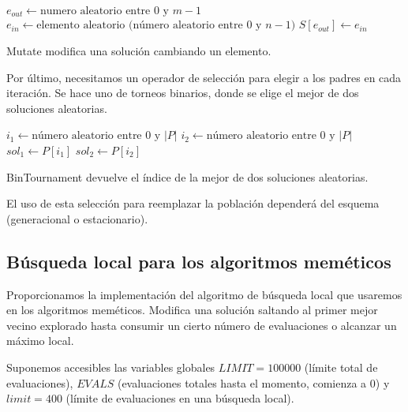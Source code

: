 \documentclass{article}
\begin{document}
\begin{algorithm}[H]
	\DontPrintSemicolon %
	$e_{out}\gets\text{numero aleatorio entre $0$ y $m-1$}$ 
	$e_{in}\gets\text{elemento aleatorio (número aleatorio entre $0$ y $n-1$)}$\;
	$S[e_{out}]\gets e_{in}$
	\caption{{\sc Mutate} modifica una solución cambiando un elemento.}
	\label{alg:mutate}
\end{algorithm}

Por último, necesitamos un operador de selección para elegir a los padres en cada iteración. Se hace uno de torneos binarios, donde se elige el mejor de dos soluciones aleatorias.

\begin{algorithm}[H]
	\DontPrintSemicolon %
	$i_1\gets\text{número aleatorio entre 0 y $|P|$}$\;
	$i_2\gets\text{número aleatorio entre 0 y $|P|$}$\;
	$sol_1\gets P[i_1]$\;
	$sol_2\gets P[i_2]$\;
	\caption{{\sc BinTournament} devuelve el índice de la mejor de dos soluciones aleatorias.}
	\label{alg:bin-tournament}
\end{algorithm}

El uso de esta selección para reemplazar la población dependerá del esquema (generacional o estacionario).

\subsection{Búsqueda local para los algoritmos meméticos}

Proporcionamos la implementación del algoritmo de búsqueda local que usaremos en los algoritmos meméticos. Modifica una solución
saltando al primer mejor vecino explorado hasta consumir un cierto número de evaluaciones o alcanzar un máximo local.

Suponemos accesibles las variables globales $LIMIT=100000$ (límite total de evaluaciones), $EVALS$ (evaluaciones totales hasta el momento, comienza
a 0)
y $limit=400$ (límite de evaluaciones en una búsqueda local).
\end{document}
